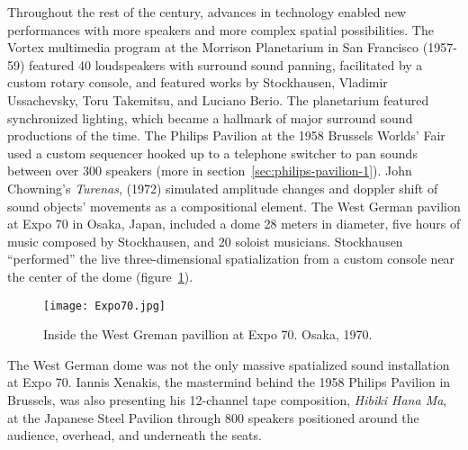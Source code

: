Throughout the rest of the century, advances in technology enabled new
performances with more speakers and more complex spatial
possibilities. The Vortex multimedia program at the Morrison
Planetarium in San Francisco (1957-59) featured 40 loudspeakers with
surround sound panning, facilitated by a custom rotary console, and
featured works by Stockhausen, Vladimir Ussachevsky, Toru Takemitsu,
and Luciano Berio. The planetarium featured synchronized lighting,
which became a hallmark of major surround sound productions of the
time. The Philips Pavilion at the 1958 Brussels Worlds' Fair used a
custom sequencer hooked up to a telephone switcher to pan sounds
between over 300 speakers (more in
section~\ref{sec:philips-pavilion-1}).  John Chowning's
\textit{Turenas}, (1972) simulated amplitude changes and doppler shift
of sound objects' movements as a compositional
element.\cite{Chowning2011} The West German pavilion at Expo 70 in
Osaka, Japan, included a dome 28 meters in diameter, five hours of
music composed by Stockhausen, and 20 soloist musicians. Stockhausen
``performed'' the live three-dimensional spatialization from a custom
console near the center of the dome (figure~\ref{fig:stockhausen-expo}).
\begin{figure}
\texttt{[image: Expo70.jpg]}
\caption{Inside the West Greman pavillion at Expo 70. Osaka, 1970.}
\label{fig:stockhausen-expo}
\end{figure}
The West German dome was not the only massive spatialized sound
installation at Expo 70. Iannis Xenakis, the mastermind behind the
1958 Philips Pavilion in Brussels, was also presenting his 12-channel
tape composition, \textit{Hibiki Hana Ma}, at the Japanese Steel
Pavilion through 800 speakers positioned around the audience,
overhead, and underneath the seats. 


